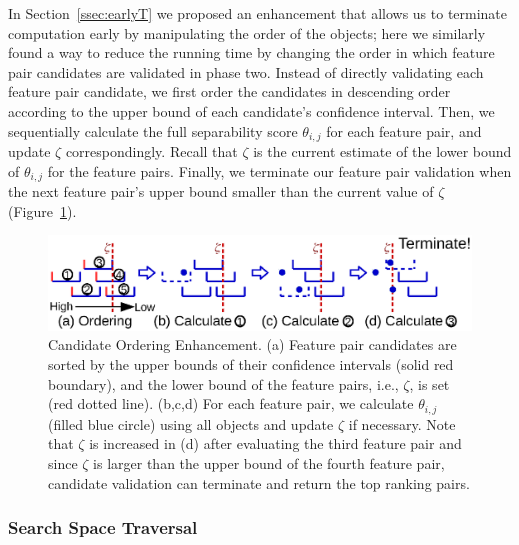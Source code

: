 In Section~\ref{ssec:earlyT} we proposed an enhancement
that allows us to terminate computation early by
manipulating the order of the objects;
here we similarly found a way to reduce the running
time by changing the order in which feature pair candidates
are validated in phase two.
Instead of directly validating each feature pair candidate,
we first order the candidates in descending order according to the upper bound of each candidate's confidence interval.
Then, we sequentially calculate the full separability
score $\theta_{i,j}$ for each feature pair, and update $\zeta$ correspondingly.
Recall that $\zeta$ is the current estimate of the lower bound of $\theta_{i,j}$ for the \topk feature pairs. Finally, we terminate our feature
pair validation when the next feature pair's upper bound smaller than the current value of $\zeta$ (Figure~\ref{fig:candidate_ordering}).

\begin{figure}[h]
 \centering
 \vspace{-5mm}
 \includegraphics[width=0.9\linewidth]{fig/candidate_ordering.eps}
 \vspace{-5mm}
\caption{Candidate Ordering Enhancement. (a) Feature pair candidates are sorted by the upper bounds of their confidence intervals (solid red boundary), and the lower bound of the \topthree feature pairs, i.e., $\zeta$, is set (red dotted line). (b,c,d) For each feature pair, we calculate $\theta_{i,j}$ (filled blue circle) using all objects and update $\zeta$ if necessary. Note that $\zeta$ is increased in (d) after evaluating the third feature pair and since $\zeta$ is larger than the upper bound of the fourth feature pair, candidate validation can terminate and return the top ranking pairs.}
\vspace{-5mm}
\label{fig:candidate_ordering}
\end{figure}

\subsubsection{Search Space Traversal} \label{ssec:traversal}


